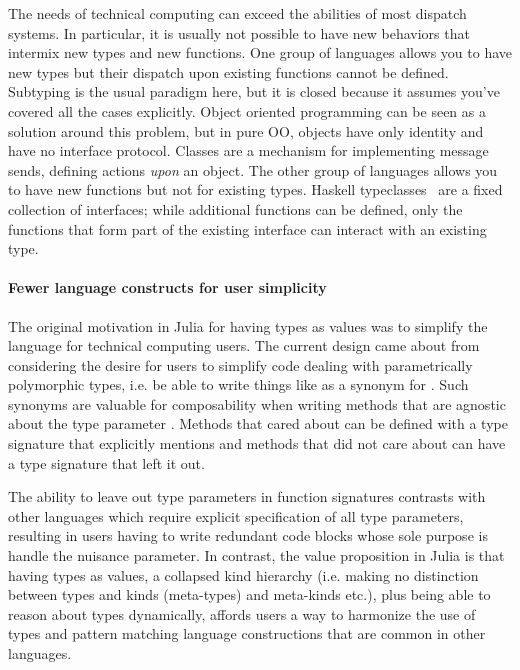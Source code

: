 
The needs of technical computing can exceed the abilities of most dispatch systems. In particular, it is usually not possible to have new behaviors that intermix new types and new functions. One group of languages allows you to have new types but their dispatch upon existing functions cannot be defined. Subtyping is the usual paradigm here, but it is closed because it assumes you've covered all the cases explicitly. Object oriented programming can be seen as a solution around this problem, but in pure OO, objects have only identity and have no interface protocol. Classes are a mechanism for implementing message sends, defining actions \textit{upon} an object. The other group of languages allows you to have new functions but not for existing types. Haskell typeclasses~\cite{typeclass} are a fixed collection of interfaces; while additional functions can be defined, only the functions that form part of the existing interface can interact with an existing type.

\paragraph{Fewer language constructs for user simplicity}

The original motivation in Julia for having types as values was to simplify the
language for technical computing users. The current design came about from
considering the desire for users to simplify code dealing with parametrically
polymorphic types, i.e. be able to write things like  as a synonym
for . Such synonyms are valuable for composability when writing 
methods that are agnostic about the type parameter . Methods that cared
about  can be defined with a type signature that explicitly mentions
 and methods that did not care about  can have a type signature
that left it out.

The ability to leave out type parameters in function signatures contrasts with
other languages which require explicit specification of all type parameters,
resulting in users having to write redundant code blocks whose sole purpose is
handle the nuisance parameter. In contrast, the value proposition in Julia is
that having types as values, a collapsed kind hierarchy (i.e. making no
distinction between types and kinds (meta-types) and meta-kinds etc.), plus
being able to reason about types dynamically, affords users a way to harmonize
the use of types and pattern matching language constructions that are common in
other languages.
